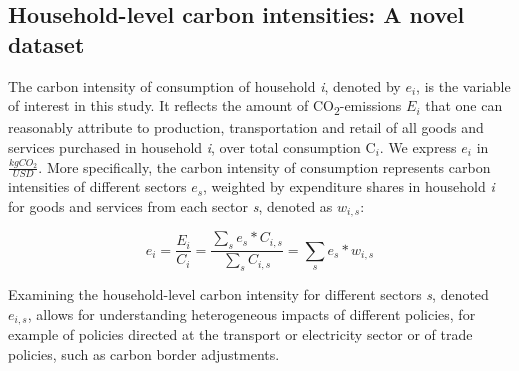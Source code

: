 \documentclass[12pt, a4paper]{article}
\begin{document}
\subsection{Household-level carbon intensities: A novel dataset} \label{sec:data}

The carbon intensity of consumption of household \textit{i}, denoted by $e_{i}$, is the variable of interest in this study. It reflects the amount of CO\textsubscript{2}-emissions $E_{i}$ that one can reasonably attribute to production, transportation and retail of all goods and services purchased in household \textit{i}, over total consumption C$_{i}$. We express $e_{i}$ in $\frac{kgCO_{2}}{USD}$. More specifically, the carbon intensity of consumption represents carbon intensities of different sectors $e_{s}$, weighted by expenditure shares in household \textit{i} for goods and services from each sector \textit{s}, denoted as $w_{i,s}$:


\begin{equation} \label{eq:ei}
e_{i} = \frac{E_{i}}{C_{i}} = \frac{\sum_{s} e_{s}*C_{i,s}}{\sum_{s} C_{i,s}} = \sum_{s} e_{s}*w_{i,s}
\end{equation}


Examining the household-level carbon intensity for different sectors \textit{s}, denoted $e_{i,s}$, allows for understanding heterogeneous impacts of different policies, for example of policies directed at the transport or electricity sector or of trade policies, such as carbon border adjustments.

\end{document}
